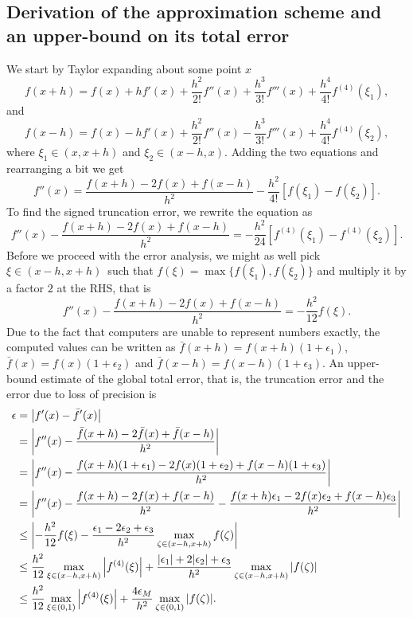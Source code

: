 \documentclass[english,notitlepage]{revtex4-1}  %
\begin{document}
\subsection{Derivation of the approximation scheme and an upper-bound on its total error}

We start by Taylor expanding about some point $x$ 
\begin{equation}
	f(x+h) = f(x) + hf'(x) + \frac{h^2}{2!}f''(x) + \frac{h^3}{3!}f'''(x) + \frac{h^4}{4!}f^{(4)}(\xi_1),
\end{equation}
and 
\begin{equation}
	f(x-h) = f(x) - hf'(x) + \frac{h^2}{2!}f''(x) - \frac{h^3}{3!}f'''(x) + \frac{h^4}{4!}f^{(4)}(\xi_2),
\end{equation}
where $\xi_1 \in (x,x+h)$ and $\xi_2 \in (x-h,x)$. Adding the two equations and rearranging a bit we get 
\begin{equation}
	f''(x) = \frac{f(x+h)-2f(x) + f(x-h)}{h^2} - \frac{h^2}{4!}\left[f(\xi_1)-f(\xi_2)\right].
\end{equation}
To find the signed truncation error, we rewrite the equation as 
\begin{equation}
	f''(x) - \frac{f(x+h)-2f(x) + f(x-h)}{h^2} = -\frac{h^2}{24}\left[f^{(4)}(\xi_1)-f^{(4)}(\xi_2)\right].
\end{equation}
Before we proceed with the error analysis, we might as well pick $\xi \in (x-h,x+h)$ such that $f(\xi) = \max \{f(\xi_1),f(\xi_2)\}$ and multiply it by a factor $2$ at the RHS, that is
\begin{equation}
	f''(x) - \frac{f(x+h)-2f(x) + f(x-h)}{h^2} = -\frac{h^2}{12}f(\xi).
\end{equation}
Due to the fact that computers are unable to represent numbers exactly, the computed values can be written as $\bar{f}(x+h) = f(x+h)(1+\epsilon_1)$, $\bar{f}(x) = f(x)(1+\epsilon_2)$ and $\bar{f}(x-h) = f(x-h)(1+\epsilon_3)$. An upper-bound estimate of the global total error, that is, the truncation error and the error due to loss of precision is 
\begin{equation}
	\begin{split}
	\epsilon & = \abs{f'(x) - \bar{f}'(x)} \\
			 & = \abs{f''(x) - \frac{\bar{f}(x+h)-2\bar{f}(x) + \bar{f}(x-h)}{h^2}}\\
			 & = \abs{f''(x) - \frac{f(x+h)(1+\epsilon_1)-2f(x)(1+\epsilon_2) + f(x-h)(1+\epsilon_3)}{h^2}} \\
			 & = \abs{f''(x) - \frac{f(x+h)-2f(x) + f(x-h)}{h^2} - \frac{f(x+h)\epsilon_1 - 2f(x)\epsilon_2 + f(x-h)\epsilon_3}{h^2}} \\
			 & \leq \abs{-\frac{h^2}{12}f(\xi)- \frac{\epsilon_1 - 2\epsilon_2 + \epsilon_3}{h^2}\max_{\zeta \in (x-h,x+h)}f(\zeta)} \\
			 & \leq 
			 \frac{h^2}{12}\max_{\xi \in (x-h,x+h)}\abs{f^{(4)}(\xi)} + \frac{\abs{\epsilon_1} + 2\abs{\epsilon_2} + \epsilon_3}{h^2}\max_{\zeta \in (x-h,x+h)}\abs{f(\zeta)} \\
			 & \leq \frac{h^2}{12}\max_{\xi \in (0,1)}\abs{f^{(4)}(\xi)} + \frac{4\epsilon_M}{h^2}\max_{\zeta \in (0,1)}\abs{f(\zeta)}.
	\end{split}
\end{equation}
\end{document}
